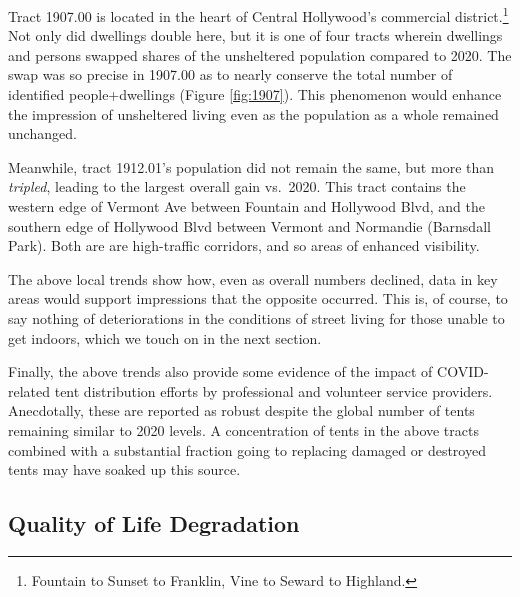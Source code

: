 \documentclass[11pt,twocolumn]{article}
\begin{document}
Tract 1907.00 is located in the heart of Central Hollywood's commercial district.\footnote{Fountain to Sunset to Franklin, 
Vine to Seward to Highland.}  Not only did dwellings double here, but it is one of four tracts wherein dwellings
and persons swapped shares of the unsheltered population compared to 2020. The swap was so precise in 1907.00
as to nearly conserve the total number of identified people+dwellings (Figure \ref{fig:1907}). This phenomenon would 
enhance the impression of unsheltered living even as the population as a whole remained unchanged.

Meanwhile, tract 1912.01's population did not remain the same, but more than {\it tripled}, leading to the largest 
overall gain vs.~2020. This tract contains the western edge of Vermont Ave between Fountain and Hollywood
Blvd, and the southern edge of Hollywood Blvd between Vermont and Normandie (Barnsdall Park). Both are
are high-traffic corridors, and so areas of enhanced visibility. 

The above local trends show how, even as overall numbers declined, data in key areas would support impressions
that the opposite occurred. This is, of course, to say nothing of deteriorations in the conditions of street living
for those unable to get indoors, which we touch on in the next section.

Finally, the above trends also provide some evidence of the impact of COVID-related tent distribution efforts 
by professional and volunteer service providers. Anecdotally, these are reported as robust despite the global 
number of tents remaining similar to 2020 levels. A concentration of tents in the above tracts combined with a 
substantial fraction going to replacing damaged or destroyed tents may have soaked up this source.



\subsection{Quality of Life Degradation}
\end{document}
